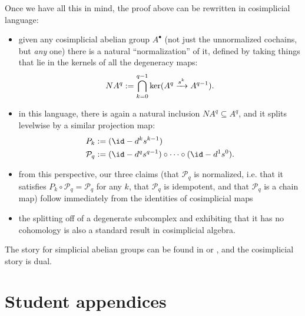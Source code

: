 \documentclass[11pt]{book}
\begin{document}
\begin{remark}
Once we have all this in mind, the proof above can be rewritten in cosimplicial language:
\begin{itemize}
    \item given any cosimplicial abelian group $A^\bullet$ (not just the unnormalized cochains, but \emph{any} one) there is a natural ``normalization'' of it, defined by taking things that lie in the kernels of all the degeneracy maps:
    \begin{align*}
        NA^q := \bigcap_{k=0}^{q-1} \ker(A^q \xrightarrow{s^k} A^{q-1}).
    \end{align*}
    \item in this language, there is again a natural inclusion $NA^q \subseteq A^q$, and it splits levelwise by a similar projection map:
    \begin{align*}
        P_k &:= (\id - d^k s^{k-1}) \\
        \mathcal{P}_q &:= (\id - d^q s^{q-1}) \circ \cdots \circ (\id - d^1 s^0).
    \end{align*}
    \item from this perspective, our three claims (that $\mathcal{P}_q$ is normalized, i.e. that it satisfies $P_k\circ \mathcal{P}_q = \mathcal{P}_q$ for any $k$, that $\mathcal{P}_q$ is idempotent, and that $\mathcal{P}_q$ is a chain map) follow immediately from the identities of cosimplicial maps
    \item the splitting off of a degenerate subcomplex and exhibiting that it has no cohomology is also a standard result in cosimplicial algebra. 
\end{itemize}
The story for simplicial abelian groups can be found in \cite[VIII.6]{Maclane-homology} or \cite[III.2]{GoerssJardine}, and the cosimplicial story is dual.
\end{remark}



\chapter{Student appendices}
\minitoc





%






\end{document}
